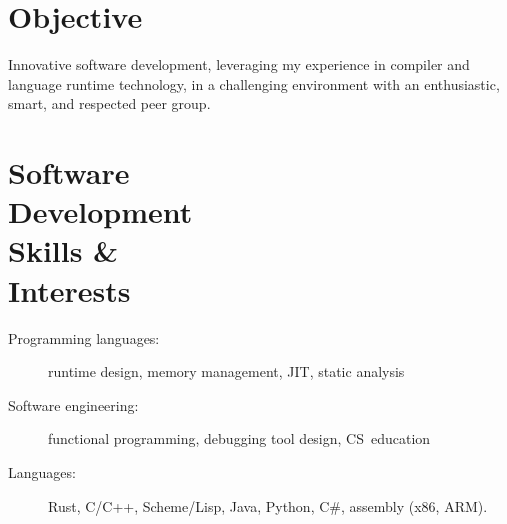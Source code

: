 \documentclass[margin,line,draft]{res}
\def\noneed#1{}
\newcommand{\mysidestyle}{\sc}
\begin{document}
%
\address{42 Pinecliff Dr, Marblehead, MA, 01945 USA\\phone: +1 857.472.3757\\
e-mail: {\tt felix.klock@gmail.com}
}
\begin{resume}
  \vspace{-7mm}

    \section{\mysidestyle Objective}
    Innovative software development,
    leveraging my experience
    in compiler and language runtime technology,
    in a challenging environment with
    an enthusiastic, smart, and respected peer group.

    \vspace{-4mm}
    \section{\mysidestyle Software\\Development\\Skills \&\\Interests}
    \begin{description}
      \item[\rm Programming languages:] runtime design, memory management, JIT, static analysis
        \vspace{-1ex}
      \item[\rm Software engineering:] functional programming, \noneed{system modeling, }debugging tool design, CS~education%
        \noneed{\\ Programming Language Design: Type and Effect Systems, Syntatic Extension}
        \vspace{-1ex}
      \item[\rm Languages:] Rust, C/C++, Scheme/Lisp, Java, Python, C\#, assembly (x86, ARM)\noneed{, FORTH, \LaTeXe}.
    \end{description}

\end{resume}
\end{document}

